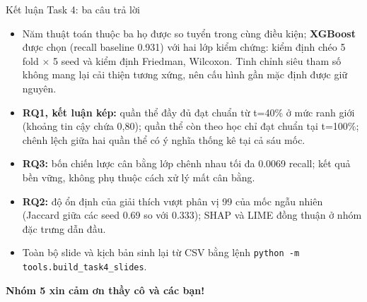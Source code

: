 \documentclass[aspectratio=169,11pt]{beamer}
\begin{document}
\begin{frame}{Kết luận Task 4: ba câu trả lời}
\begin{itemize}
  \item Năm thuật toán thuộc ba họ được so tuyển trong cùng điều kiện; \textbf{XGBoost} được chọn (recall baseline 0.931) với hai lớp kiểm chứng: kiểm định chéo 5 fold $\times$ 5 seed và kiểm định Friedman, Wilcoxon. Tinh chỉnh siêu tham số không mang lại cải thiện tương xứng, nên cấu hình gần mặc định được giữ nguyên.
  \item \textbf{RQ1, kết luận kép:} quần thể đầy đủ đạt chuẩn từ t=40\% ở mức ranh giới (khoảng tin cậy chứa 0,80); quần thể còn theo học chỉ đạt chuẩn tại t=100\%; chênh lệch giữa hai quần thể có ý nghĩa thống kê tại cả sáu mốc.
  \item \textbf{RQ3:} bốn chiến lược cân bằng lớp chênh nhau tối đa 0.0069 recall; kết quả bền vững, không phụ thuộc cách xử lý mất cân bằng.
  \item \textbf{RQ2:} độ ổn định của giải thích vượt phân vị 99 của mốc ngẫu nhiên (Jaccard giữa các seed 0.69 so với 0.333); SHAP và LIME đồng thuận ở nhóm đặc trưng dẫn đầu.
  \item Toàn bộ slide và kịch bản sinh lại từ CSV bằng lệnh \texttt{python -m tools.build\_task4\_slides}.
\end{itemize}
\vspace{2mm}
\centering\color{themecol}\textbf{Nhóm 5 xin cảm ơn thầy cô và các bạn!}
\end{frame}
\end{document}
